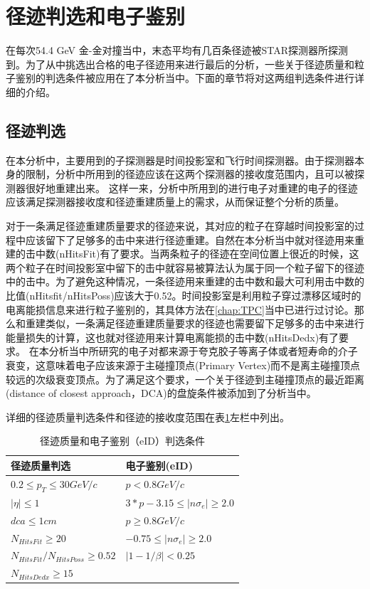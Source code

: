 \section{径迹判选和电子鉴别}
在每次54.4 GeV 金-金对撞当中，末态平均有几百条径迹被STAR探测器所探测到。为了从中挑选出合格的电子径迹用来进行最后的分析，一些关于径迹质量和粒子鉴别的判选条件被应用在了本分析当中。下面的章节将对这两组判选条件进行详细的介绍。
\subsection{径迹判选}
\label{chap:track_selection}
在本分析中，主要用到的子探测器是时间投影室和飞行时间探测器。由于探测器本身的限制，分析中所用到的径迹应该在这两个探测器的接收度范围内，且可以被探测器很好地重建出来。
这样一来，分析中所用到的进行电子对重建的电子的径迹应该满足探测器接收度和径迹重建质量上的需求，从而保证整个分析的质量。

对于一条满足径迹重建质量要求的径迹来说，其对应的粒子在穿越时间投影室的过程中应该留下了足够多的击中来进行径迹重建。自然在本分析当中就对径迹用来重建的击中数(nHitsFit)有了要求。当两条粒子的径迹在空间位置上很近的时候，这两个粒子在时间投影室中留下的击中就容易被算法认为属于同一个粒子留下的径迹中的击中。为了避免这种情况，一条径迹用来重建的击中数和最大可利用击中数的比值(nHitsfit/nHitsPoss)应该大于0.52。时间投影室是利用粒子穿过漂移区域时的电离能损信息来进行粒子鉴别的，其具体方法在\ref{chap:TPC}当中已进行过讨论。那么和重建类似，一条满足径迹重建质量要求的径迹也需要留下足够多的击中来进行能量损失的计算，这也就对径迹用来计算电离能损的击中数(nHitsDedx)有了要求。
在本分析当中所研究的电子对都来源于夸克胶子等离子体或者短寿命的介子衰变，这意味着电子应该来源于主碰撞顶点(Primary Vertex)而不是离主碰撞顶点较远的次级衰变顶点。为了满足这个要求，一个关于径迹到主碰撞顶点的最近距离(distance of closest approach，DCA)的盘旋条件被添加到了分析当中。

详细的径迹质量判选条件和径迹的接收度范围在表\ref{tab:TrackQuality}左栏中列出。

\begin{table}[h!]
    \centering
    \caption{径迹质量和电子鉴别（eID）判选条件}
    \label{tab:TrackQuality}
    \begin{tabularx}{0.8\textwidth} {
    | >{\centering\arraybackslash}X |>{\centering\arraybackslash}X | }
        \hline
        径迹质量判选 & 电子鉴别(eID)   \\
        \hline
        $0.2 \leq p_{T} \leq 30 GeV/c $ & $p<0.8 GeV/c $ \\
        $|\eta| \leq 1 $ & $ 3*p - 3.15 \leq |n\sigma_{e}| \geq 2.0$  \\
        $dca \leq 1cm $ & $p \geq 0.8 GeV/c $\\ 
        $N_{HitsFit} \geq 20 $  & $ -0.75 \leq |n\sigma_{e}| \geq 2.0 $\\
        ${N_{HitsFit}}/{N_{HitsPoss}} \geq 0.52 $ &  $|1-1/\beta| < 0.25 $\\
        $N_{HitsDedx} \geq 15 $  & \\
        \hline
    \end{tabularx}
\end{table}

